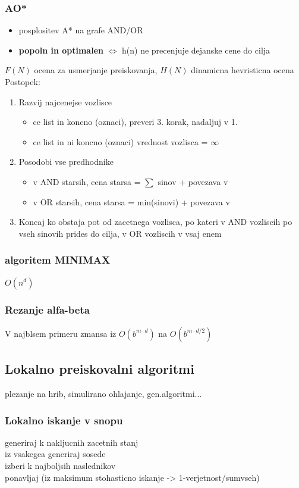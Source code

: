 \subsubsection{AO*}
\begin{itemize}[noitemsep,topsep=0pt,leftmargin=*]
    \item posplositev A* na grafe AND/OR
    \item \textbf{popoln in optimalen} $\Leftrightarrow$ h(n) ne precenjuje dejanske cene do cilja
\end{itemize}
$F(N)$ ocena za usmerjanje preiskovanja, $H(N)$ dinamicna hevristicna ocena\\
Postopek:
\begin{enumerate}[noitemsep,topsep=0pt,leftmargin=*]
    \item Razvij najcenejse vozlisce
    \begin{itemize}[noitemsep,topsep=0pt,leftmargin=*]
        \item ce list in koncno (oznaci), preveri 3. korak, nadaljuj v 1.
        \item ce list in ni koncno (oznaci) vrednost vozlisca = $\infty$
    \end{itemize}
    \item Posodobi vse predhodnike
    \begin{itemize}[noitemsep,topsep=0pt,leftmargin=*]
        \item v AND starsih, cena starsa = $\sum$ sinov + povezava v
        \item v OR starsih, cena starsa = min(sinovi) + povezava v
    \end{itemize}
    \item Koncaj ko obstaja pot od zacetnega vozlisca, po kateri v AND vozliscih po vseh sinovih prides do cilja, v OR vozliscih v vsaj enem
\end{enumerate}
\subsubsection{algoritem MINIMAX}
$O(n^d)$
\subsubsection{Rezanje alfa-beta}
V najblsem primeru zmansa iz $O(b^{m \cdot d})$ na $O(b^{m \cdot d/2})$\\
\subsection{Lokalno preiskovalni algoritmi}
plezanje na hrib, simulirano ohlajanje, gen.algoritmi...
\subsubsection{Lokalno iskanje v snopu}
generiraj k nakljucnih zacetnih stanj\\
iz vsakegea generiraj sosede\\
izberi k najboljsih naslednikov\\
ponavljaj (iz maksimum stohasticno iskanje -> 1-verjetnost/sumvseh)
